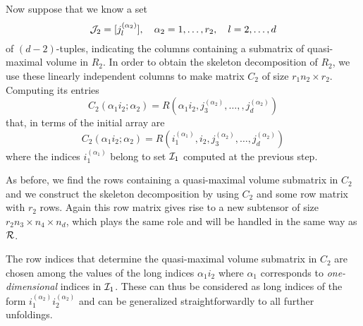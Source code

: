 Now suppose that we know a set
\begin{equation*}
  \mathcal{J}_2 = [j_l^{(\alpha_2)}], \quad \alpha_2 = 1,\ldots,r_2, \quad l = 2,\ldots,d
\end{equation*}
of $(d-2)$-tuples, indicating the columns containing a submatrix of quasi-maximal volume in $R_2$. In order to obtain the skeleton decomposition of $R_2$, we use these linearly independent  columns to make matrix $C_2$ of size $r_1 n_2 \times r_2$. Computing its entries
\begin{equation*}
  C_2(\alpha_1 i_2; \alpha_2) = R(\alpha_1 i_2,j_3^{(\alpha_2)},\ldots,,j_d^{(\alpha_2)})
\end{equation*}
that, in terms of the initial array are
\begin{equation*}
  C_2(\alpha_1 i_2; \alpha_2) = R(i_1^{(\alpha_1)},i_2,j_3^{(\alpha_2)},\ldots,j_d^{(\alpha_2)})
\end{equation*}
where the indices $i_1^{(\alpha_1)}$ belong to set $\mathcal{I}_1$ computed at the previous step.

As before, we find the rows containing a quasi-maximal volume submatrix  in $C_2$ and we construct the skeleton decomposition by using $C_2$ and some row matrix with $r_2$ rows. Again this row matrix gives rise to a new subtensor of size $r_2n_3 \times n_4 \times n_d$, which plays the same role and will be handled in the same way as $\mathcal{R}$.

The row indices that determine the quasi-maximal volume submatrix in $C_2$ are chosen among the values of the long indices $\alpha_1i_2$ where $\alpha_1$ corresponds to \emph{one-dimensional} indices in $\mathcal{I}_1$. These can thus be considered as long indices of the form $i_1^{(\alpha_2)}i_2^{(\alpha_2)}$ and can be generalized straightforwardly to all further unfoldings.

